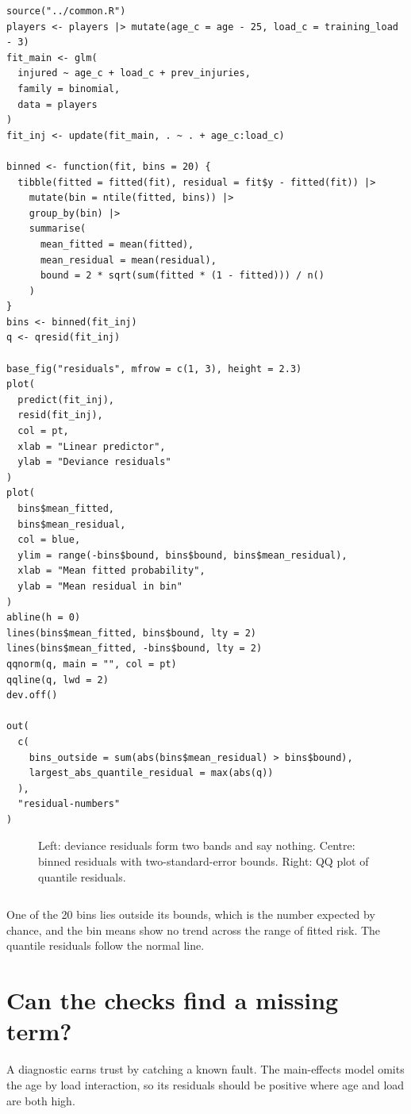 \documentclass[12pt,notitlepage]{report}
\begin{document}
\begin{verbatim}
source("../common.R")
players <- players |> mutate(age_c = age - 25, load_c = training_load - 3)
fit_main <- glm(
  injured ~ age_c + load_c + prev_injuries,
  family = binomial,
  data = players
)
fit_inj <- update(fit_main, . ~ . + age_c:load_c)

binned <- function(fit, bins = 20) {
  tibble(fitted = fitted(fit), residual = fit$y - fitted(fit)) |>
    mutate(bin = ntile(fitted, bins)) |>
    group_by(bin) |>
    summarise(
      mean_fitted = mean(fitted),
      mean_residual = mean(residual),
      bound = 2 * sqrt(sum(fitted * (1 - fitted))) / n()
    )
}
bins <- binned(fit_inj)
q <- qresid(fit_inj)

base_fig("residuals", mfrow = c(1, 3), height = 2.3)
plot(
  predict(fit_inj),
  resid(fit_inj),
  col = pt,
  xlab = "Linear predictor",
  ylab = "Deviance residuals"
)
plot(
  bins$mean_fitted,
  bins$mean_residual,
  col = blue,
  ylim = range(-bins$bound, bins$bound, bins$mean_residual),
  xlab = "Mean fitted probability",
  ylab = "Mean residual in bin"
)
abline(h = 0)
lines(bins$mean_fitted, bins$bound, lty = 2)
lines(bins$mean_fitted, -bins$bound, lty = 2)
qqnorm(q, main = "", col = pt)
qqline(q, lwd = 2)
dev.off()

out(
  c(
    bins_outside = sum(abs(bins$mean_residual) > bins$bound),
    largest_abs_quantile_residual = max(abs(q))
  ),
  "residual-numbers"
)
\end{verbatim}

\begin{figure}[H]
  \centering
  \caption{Left: deviance residuals form two bands and say nothing. Centre:
    binned residuals with two-standard-error bounds. Right: QQ plot of
  quantile residuals.}
  \label{fig:residuals}
\end{figure}

\inputminted{text}{output/residual-numbers.txt}

One of the 20 bins lies outside its bounds, which is the number expected by
chance, and the bin means show no trend across the range of fitted risk. The
quantile residuals follow the normal line.

\section{Can the checks find a missing term?}

A diagnostic earns trust by catching a known fault. The main-effects model
omits the age by load interaction, so its residuals should be positive where
age and load are both high.
\end{document}
